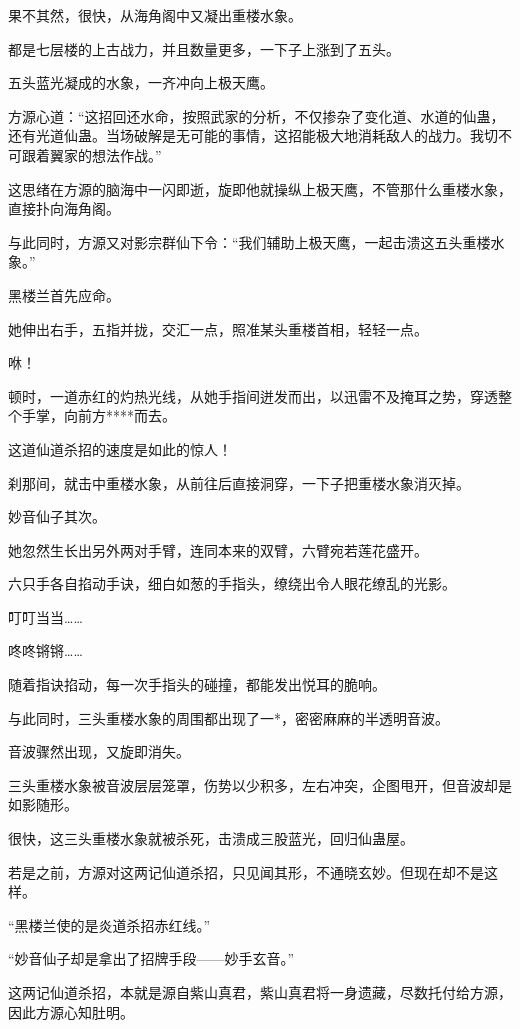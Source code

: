 \begin{this_body}
果不其然，很快，从海角阁中又凝出重楼水象。

都是七层楼的上古战力，并且数量更多，一下子上涨到了五头。

五头蓝光凝成的水象，一齐冲向上极天鹰。

方源心道：“这招回还水命，按照武家的分析，不仅掺杂了变化道、水道的仙蛊，还有光道仙蛊。当场破解是无可能的事情，这招能极大地消耗敌人的战力。我切不可跟着翼家的想法作战。”

这思绪在方源的脑海中一闪即逝，旋即他就操纵上极天鹰，不管那什么重楼水象，直接扑向海角阁。

与此同时，方源又对影宗群仙下令：“我们辅助上极天鹰，一起击溃这五头重楼水象。”

黑楼兰首先应命。

她伸出右手，五指并拢，交汇一点，照准某头重楼首相，轻轻一点。

咻！

顿时，一道赤红的灼热光线，从她手指间迸发而出，以迅雷不及掩耳之势，穿透整个手掌，向前方****而去。

这道仙道杀招的速度是如此的惊人！

刹那间，就击中重楼水象，从前往后直接洞穿，一下子把重楼水象消灭掉。

妙音仙子其次。

她忽然生长出另外两对手臂，连同本来的双臂，六臂宛若莲花盛开。

六只手各自掐动手诀，细白如葱的手指头，缭绕出令人眼花缭乱的光影。

叮叮当当……

咚咚锵锵……

随着指诀掐动，每一次手指头的碰撞，都能发出悦耳的脆响。

与此同时，三头重楼水象的周围都出现了一*，密密麻麻的半透明音波。

音波骤然出现，又旋即消失。

三头重楼水象被音波层层笼罩，伤势以少积多，左右冲突，企图甩开，但音波却是如影随形。

很快，这三头重楼水象就被杀死，击溃成三股蓝光，回归仙蛊屋。

若是之前，方源对这两记仙道杀招，只见闻其形，不通晓玄妙。但现在却不是这样。

“黑楼兰使的是炎道杀招赤红线。”

“妙音仙子却是拿出了招牌手段——妙手玄音。”

这两记仙道杀招，本就是源自紫山真君，紫山真君将一身遗藏，尽数托付给方源，因此方源心知肚明。


\end{this_body}
